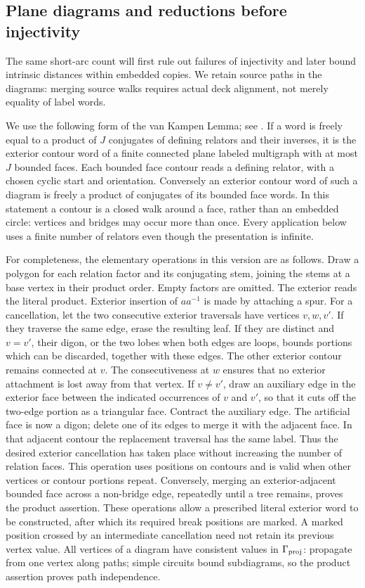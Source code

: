 \subsection{Plane diagrams and reductions before injectivity}
\label{geo:diagrams}

The same short-arc count will first rule out failures of injectivity and
later bound intrinsic distances within embedded copies.  We retain
source paths in the diagrams: merging source walks requires actual deck
alignment, not merely equality of label words.

We use the following form of the van Kampen Lemma; see
\cite[Chapter V, Section 1]{LyndonSchupp1977}.  If a word is freely equal to a
product of $J$ conjugates of defining relators and their inverses, it is
the exterior contour word of a finite connected plane labeled multigraph
with at most $J$ bounded faces.  Each bounded face contour reads a defining
relator, with a chosen cyclic start and orientation.  Conversely an exterior
contour word of such a diagram is freely a product of conjugates of its
bounded face words.  In this statement a contour is a closed walk around a
face, rather than an embedded circle: vertices and bridges may occur more
than once.  Every application below uses a finite number of relators even
though the presentation is infinite.

For completeness, the elementary operations in this version are as follows.
Draw a polygon for each relation factor and its conjugating stem, joining
the stems at a base vertex in their product order.  Empty factors are
omitted.  The exterior reads the literal product.  Exterior insertion of
$aa^{-1}$ is made by attaching a spur.  For a cancellation, let the two
consecutive exterior traversals have vertices $v,w,v'$.  If they traverse
the same edge, erase the resulting leaf.  If they are distinct and $v=v'$,
their digon, or the two lobes when both edges are loops, bounds portions
which can be discarded, together with these edges.  The other exterior
contour remains connected at $v$.  The consecutiveness at $w$ ensures that
no exterior attachment is lost away from that vertex.  If $v\ne v'$, draw
an auxiliary edge in the exterior face between the indicated occurrences
of $v$ and $v'$, so that it cuts off the two-edge portion as a triangular
face.  Contract the auxiliary edge.  The artificial face is now a digon;
delete one of its edges to merge it with the adjacent face.  In that
adjacent contour the replacement traversal has the same label.  Thus the
desired exterior cancellation has taken place without increasing the
number of relation faces.  This operation uses positions on contours and
is valid when other vertices or contour portions repeat.  Conversely,
merging an exterior-adjacent bounded face across a non-bridge edge,
repeatedly until a tree remains, proves the product assertion.  These
operations allow a prescribed literal exterior word to be constructed,
after which its required break positions are marked.  A marked position
crossed by an intermediate cancellation need not retain its previous
vertex value.  All vertices of a diagram have consistent values in $\Gamma_{\mathrm{proj}}$:
propagate from one vertex along paths; simple circuits bound subdiagrams,
so the product assertion proves path independence.

